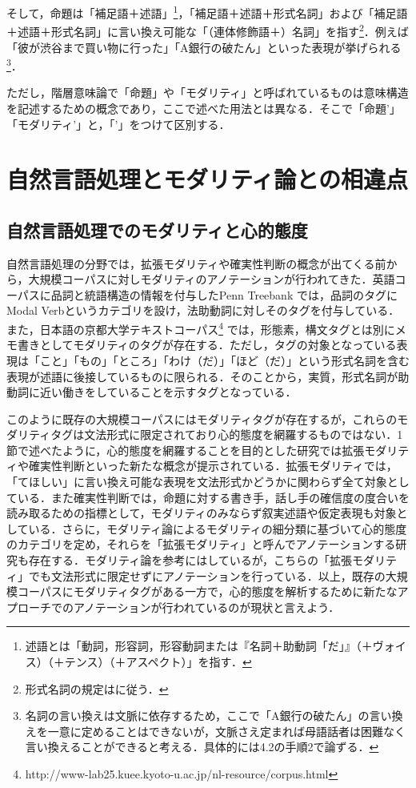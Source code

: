 \documentclass[japanese]{jnlp_1.4}
\begin{document}
そして，命題は「補足語＋述語」\inhibitglue\footnote{述語とは「動詞，形容詞，形容動詞または『名詞＋助動詞「だ」』（＋ヴォイス）（＋テンス）（＋アスペクト）」を指す．}，「補足語＋述語＋形式名詞」および「補足語＋述語＋形式名詞」に言い換え可能な「（連体修飾語＋）名詞」を指す\footnote{形式名詞の規定は\cite{Book_25}に従う．}．例えば「彼が渋谷まで買い物に行った」「A銀行の破たん」といった表現が挙げられる\footnote{名詞の言い換えは文脈に依存するため，ここで「A銀行の破たん」の言い換えを一意に定めることはできないが，文脈さえ定まれば母語話者は困難なく言い換えることができると考える．具体的には4.2の手順2で論ずる．}．

ただし，階層意味論で「命題」や「モダリティ」と呼ばれているものは意味構造を記述するための概念であり，ここで述べた用法とは異なる．そこで「命題’」「モダリティ’」と，「’」をつけて区別する．



\section{自然言語処理とモダリティ論との相違点}

\subsection{自然言語処理でのモダリティと心的態度}

自然言語処理の分野では，拡張モダリティや確実性判断の概念が出てくる前から，大規模コーパスに対しモダリティのアノテーションが行われてきた．英語コーパスに品詞と統語構造の情報を付与したPenn Treebank \cite{Article_03}では，品詞のタグにModal Verbというカテゴリを設け，法助動詞に対しそのタグを付与している\cite{Inproc_03}．また，日本語の京都大学テキストコーパス\footnote{http://www-lab25.kuee.kyoto-u.ac.jp/nl-resource/corpus.html} では，形態素，構文タグとは別にメモ書きとしてモダリティのタグが存在する．ただし，タグの対象となっている表現は「こと」「もの」「ところ」「わけ（だ）」「ほど（だ）」という形式名詞を含む表現が述語に後接しているものに限られる．そのことから，実質，形式名詞が助動詞に近い働きをしていることを示すタグとなっている．

このように既存の大規模コーパスにはモダリティタグが存在するが，これらのモダリティタグは文法形式に限定されており心的態度を網羅するものではない．1節で述べたように，心的態度を網羅することを目的とした研究では拡張モダリティや確実性判断といった新たな概念が提示されている．拡張モダリティでは，「てほしい」に言い換え可能な表現を文法形式かどうかに関わらず全て対象としている\cite{Article_01}．また確実性判断では，命題に対する書き手，話し手の確信度の度合いを読み取るための指標として，モダリティのみならず叙実述語や仮定表現も対象としている\cite{Article_02}．さらに，モダリティ論によるモダリティの細分類に基づいて心的態度のカテゴリを定め，それらを「拡張モダリティ」と呼んでアノテーションする研究も存在する\cite{Inproc_04}．モダリティ論を参考にはしているが，こちらの「拡張モダリティ」でも文法形式に限定せずにアノテーションを行っている．以上，既存の大規模コーパスにモダリティタグがある一方で，心的態度を解析するために新たなアプローチでのアノテーションが行われているのが現状と言えよう．
\end{document}
